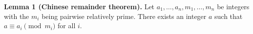 \textbf{Lemma 1 (Chinese remainder theorem).} Let $a_1, \ldots, a_n, m_1, \ldots, m_n$ be integers with the $m_i$ being pairwise relatively prime. There exists an integer $a$ such that $a \equiv a_i \pmod{m_i}$ for all $i$.
